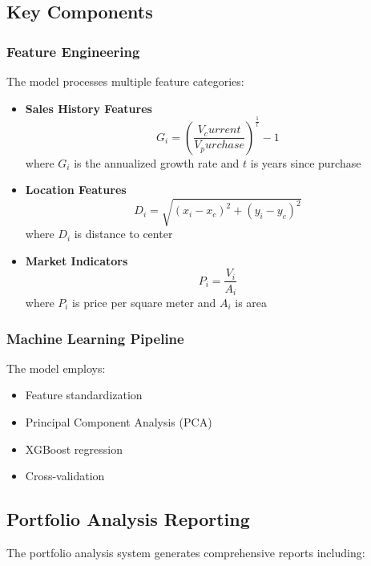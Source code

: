 \documentclass{article}
\begin{document}
\subsection{Key Components}

\subsubsection{Feature Engineering}
The model processes multiple feature categories:

\begin{itemize}
    \item \textbf{Sales History Features}
    \begin{equation}
    G_i = (\frac{V_current}{V_purchase})^{\frac{1}{t}} - 1
    \end{equation}
    where $G_i$ is the annualized growth rate and $t$ is years since purchase

    \item \textbf{Location Features}
    \begin{equation}
    D_i = \sqrt{(x_i - x_c)^2 + (y_i - y_c)^2}
    \end{equation}
    where $D_i$ is distance to center

    \item \textbf{Market Indicators}
    \begin{equation}
    P_i = \frac{V_i}{A_i}
    \end{equation}
    where $P_i$ is price per square meter and $A_i$ is area
\end{itemize}

\subsubsection{Machine Learning Pipeline}
The model employs:
\begin{itemize}
    \item Feature standardization
    \item Principal Component Analysis (PCA)
    \item XGBoost regression
    \item Cross-validation
\end{itemize}

\subsection{Portfolio Analysis Reporting}
The portfolio analysis system generates comprehensive reports including:
\end{document}
